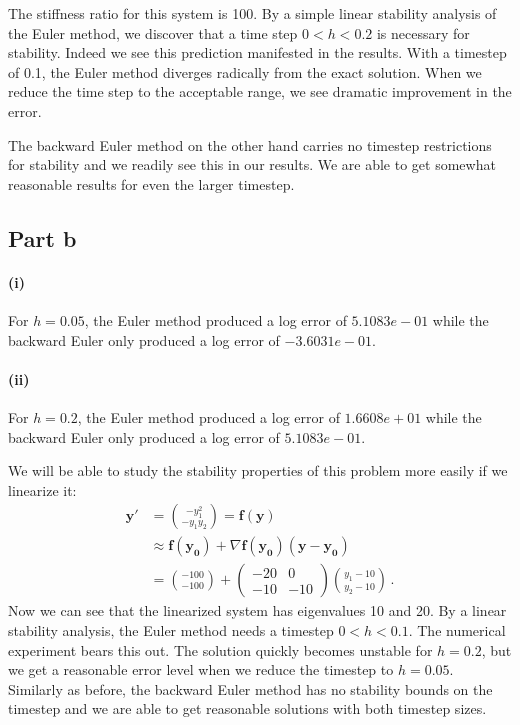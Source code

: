 \documentclass[10pt,letterpaper]{article}
\def\mbf{\mathbf}
\begin{document}
The stiffness ratio for this system is 100. By a simple linear stability analysis of the Euler method, we discover
that a time step $0<h< 0.2$ is necessary for stability. Indeed we see this prediction manifested in the results.
With a timestep of 0.1, the Euler method diverges radically from the exact solution. When we reduce the time step 
to the acceptable range, we see dramatic improvement in the error.

The backward Euler method on the other hand carries no timestep restrictions for stability and we readily see this
in our results. We are able to get somewhat reasonable results for even the larger timestep.

\subsection*{Part b}
\paragraph{(i)}For $h=0.05$, the Euler method produced a log error of $5.1083e-01$ while the 
backward Euler only produced a log error of $-3.6031e-01$.
\paragraph{(ii)}For $h=0.2$, the Euler method produced a log error of $1.6608e+01$ while the 
backward Euler only produced a log error of $5.1083e-01$.

We will be able to study the stability properties of this problem more easily if we linearize it:
\begin{align*}
    \mbf{y}'&=\binom{-y_1^2}{-y_1y_2}=\mbf{f}(\mbf{y})\\
    &\approx\mbf{f}(\mbf{y_0})+\nabla\mbf{f}(\mbf{y_0})(\mbf{y}-\mbf{y_0})\\
    &=\binom{-100}{-100}+\left(
    \begin{array}{cc}
    -20 & 0\\
    -10 & -10
\end{array}\right)\binom{y_1-10}{y_2-10}\,.
\end{align*}
Now we can see that the linearized system has eigenvalues 10 and 20. By a linear stability analysis, the Euler
method needs a timestep $0<h<0.1$. The numerical experiment bears this out. The solution quickly becomes unstable
for $h=0.2$, but we get a reasonable error level when we reduce the timestep to $h=0.05$. Similarly as before,
the backward Euler method has no stability bounds on the timestep and we are able to get reasonable solutions
with both timestep sizes.
\end{document}
